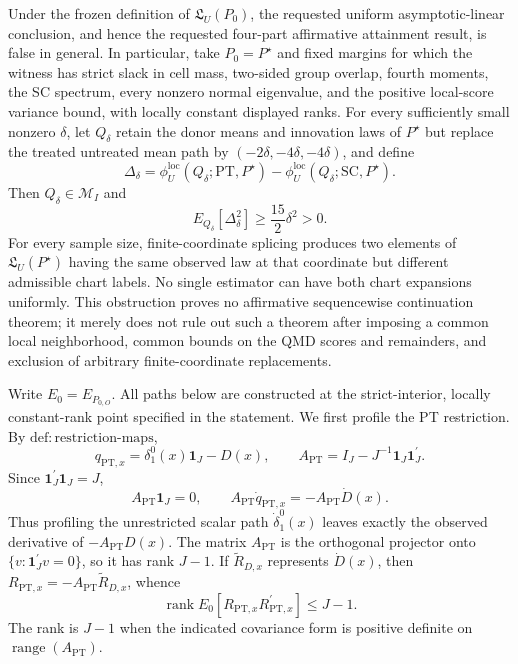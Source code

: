 Under the frozen definition of \(\mathfrak L_U(P_0)\), the requested uniform asymptotic-linear conclusion, and hence the requested four-part affirmative attainment result, is false in general. In particular, take \(P_0=P^{\star}\) and fixed margins for which the witness has strict slack in cell mass, two-sided group overlap, fourth moments, the SC spectrum, every nonzero normal eigenvalue, and the positive local-score variance bound, with locally constant displayed ranks. For every sufficiently small nonzero \(\delta\), let \(Q_\delta\) retain the donor means and innovation laws of \(P^{\star}\) but replace the treated untreated mean path by \((-2\delta,-4\delta,-4\delta)\), and define
\[
\Delta_\delta
=\phi_U^{\mathrm{loc}}(Q_\delta;\mathrm{PT},P^{\star})
-\phi_U^{\mathrm{loc}}(Q_\delta;\mathrm{SC},P^{\star}).
\]
Then \(Q_\delta\in\mathcal M_I\) and
\[
E_{Q_\delta}[\Delta_\delta^2]\ge\frac{15}{2}\delta^2>0.
\]
For every sample size, finite-coordinate splicing produces two elements of \(\mathfrak L_U(P^{\star})\) having the same observed law at that coordinate but different admissible chart labels. No single estimator can have both chart expansions uniformly. This obstruction proves no affirmative sequencewise continuation theorem; it merely does not rule out such a theorem after imposing a common local neighborhood, common bounds on the QMD scores and remainders, and exclusion of arbitrary finite-coordinate replacements.

Write \(E_0=E_{P_{0,O}}\).  All paths below are constructed at the strict-interior, locally constant-rank point specified in the statement.  We first profile the PT restriction.  By \(\mathrm{def{:}restriction\text{-}maps}\),
\[
 q_{\mathrm{PT},x}=\delta_1^0(x)\mathbf 1_J-D(x),
 \qquad
 A_{\mathrm{PT}}=I_J-J^{-1}\mathbf 1_J\mathbf 1_J^{\prime}.
 \tag{1}
\]
Since \(\mathbf 1_J^{\prime}\mathbf 1_J=J\),
\[
 A_{\mathrm{PT}}\mathbf 1_J=0,
 \qquad
 A_{\mathrm{PT}}\dot q_{\mathrm{PT},x}=-A_{\mathrm{PT}}\dot D(x).
 \tag{2}
\]
Thus profiling the unrestricted scalar path \(\dot\delta_1^0(x)\) leaves exactly the observed derivative of \(-A_{\mathrm{PT}}D(x)\).  The matrix \(A_{\mathrm{PT}}\) is the orthogonal projector onto \(\{v:\mathbf 1_J^{\prime}v=0\}\), so it has rank \(J-1\).  If \(\widetilde R_{D,x}\) represents \(\dot D(x)\), then \(R_{\mathrm{PT},x}=-A_{\mathrm{PT}}\widetilde R_{D,x}\), whence
\[
 \operatorname{rank}E_0[R_{\mathrm{PT},x}R_{\mathrm{PT},x}^{\prime}]
 \le J-1.
 \tag{3}
\]
The rank is \(J-1\) when the indicated covariance form is positive definite on \(\operatorname{range}(A_{\mathrm{PT}})\).

